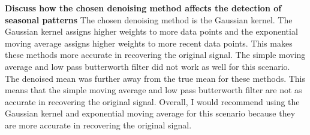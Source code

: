 \documentclass[a4paper,12pt]{article} %
\begin{document}
\newline\newline
\textbf{Discuss how the chosen denoising method affects the detection of seasonal patterns}
The chosen denoising method is the Gaussian kernel. The Gaussian kernel assigns higher weights to more data points and the exponential moving average assigns higher weights to more recent data points. This makes these methods more accurate in recovering the original signal. The simple moving average and low pass butterworth filter did not work as well for this scenario. The denoised mean was further away from the true mean for these methods. This means that the simple moving average and low pass butterworth filter are not as accurate in recovering the original signal. Overall, I would recommend using the Gaussian kernel and exponential moving average for this scenario because they are more accurate in recovering the original signal.
\end{document}
